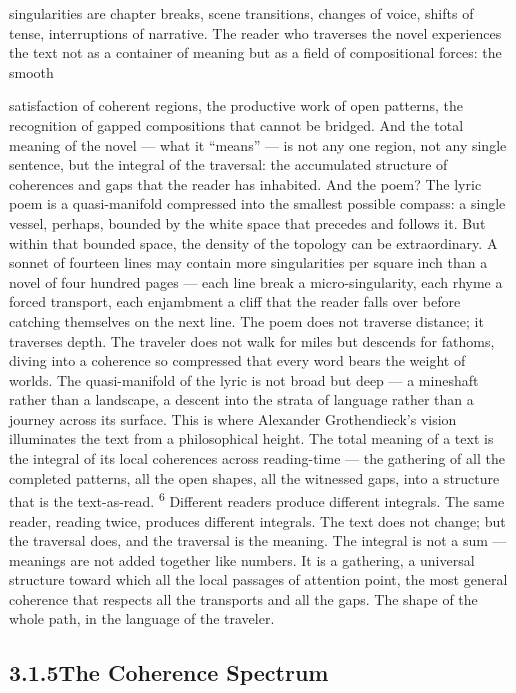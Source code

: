 singularities are chapter breaks, scene transitions, changes of voice, shifts of tense, interruptions of narrative. The reader who traverses the novel experiences the text not as a container of meaning but as a field of compositional forces: the smooth

satisfaction of coherent regions, the productive work of open patterns, the recognition of gapped compositions that cannot be bridged. And the total meaning of the novel — what it “means” — is not any one region, not any single sentence, but the integral of the traversal: the accumulated structure of coherences and gaps that the reader has inhabited. And the poem? The lyric poem is a quasi-manifold compressed into the smallest possible compass: a single vessel, perhaps, bounded by the white space that precedes and follows it. But within that bounded space, the density of the topology can be extraordinary. A sonnet of fourteen lines may contain more singularities per square inch than a novel of four hundred pages — each line break a micro-singularity, each rhyme a forced transport, each enjambment a cliff that the reader falls over before catching themselves on the next line. The poem does not traverse distance; it traverses depth. The traveler does not walk for miles but descends for fathoms, diving into a coherence so compressed that every word bears the weight of worlds. The quasi-manifold of the lyric is not broad but deep — a mineshaft rather than a landscape, a descent into the strata of language rather than a journey across its surface. This is where Alexander Grothendieck’s vision illuminates the text from a philosophical height. The total meaning of a text is the integral of its local coherences across reading-time — the gathering of all the completed patterns, all the open shapes, all the witnessed gaps, into a structure that is the text-as-read. \textsuperscript{6} Different readers produce different integrals. The same reader, reading twice, produces different integrals. The text does not change; but the traversal does, and the traversal is the meaning. The integral is not a sum — meanings are not added together like numbers. It is a gathering, a universal structure toward which all the local passages of attention point, the most general coherence that respects all the transports and all the gaps. The shape of the whole path, in the language of the traveler.

\subsection{3.1.5\quad The Coherence Spectrum}

